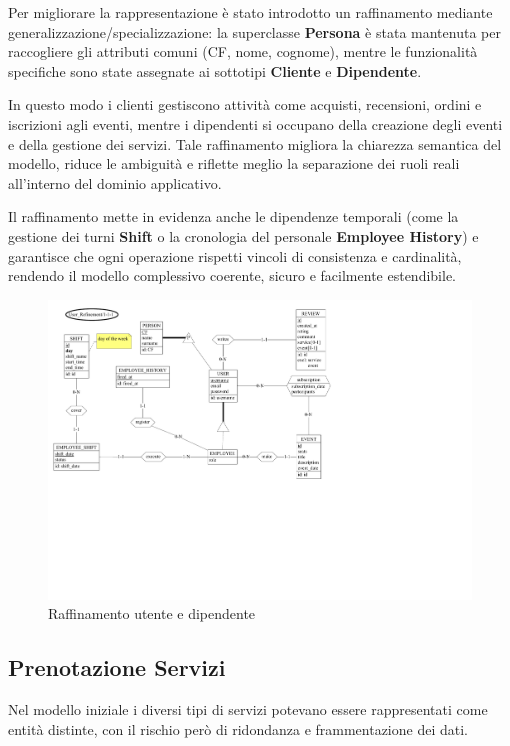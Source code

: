 \documentclass[a4paper,12pt]{report}
\begin{document}
\vspace{\baselineskip}
Per migliorare la rappresentazione è stato introdotto un raffinamento mediante 
generalizzazione/specializzazione: la superclasse \textbf{Persona} è stata mantenuta per 
raccogliere gli attributi comuni (CF, nome, cognome), mentre le funzionalità specifiche sono 
state assegnate ai sottotipi \textbf{Cliente} e \textbf{Dipendente}.

\vspace{\baselineskip}
In questo modo i clienti gestiscono attività come acquisti, recensioni, ordini e iscrizioni agli 
eventi, mentre i dipendenti si occupano della creazione degli eventi e della gestione dei 
servizi. Tale raffinamento migliora la chiarezza semantica del modello, riduce le ambiguità e 
riflette meglio la separazione dei ruoli reali all'interno del dominio applicativo.

\vspace{\baselineskip}
Il raffinamento mette in evidenza anche le dipendenze temporali (come la gestione dei turni \textbf{Shift} o la cronologia del personale \textbf{Employee History}) e garantisce che ogni operazione rispetti vincoli di consistenza e cardinalità, rendendo il modello complessivo coerente, sicuro e facilmente estendibile.

\begin{figure}[H]
	\centering
	\includegraphics[width=\textwidth, trim=0 200pt 275pt 0, clip]{./schemas/refinements/user.pdf}
	\caption{Raffinamento utente e dipendente}
	\label{fig:raffinamento-utente}
\end{figure}

\newpage
\subsection{Prenotazione Servizi}
Nel modello iniziale i diversi tipi di servizi potevano essere rappresentati come entità 
distinte, con il rischio però di ridondanza e frammentazione dei dati.
\end{document}
